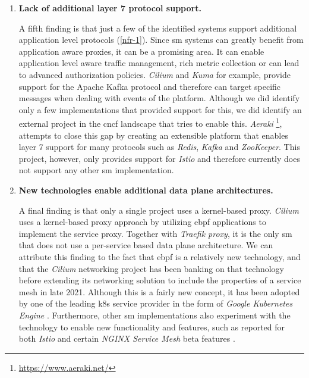 \begin{enumerate}[label=\textbf{F\arabic*}, leftmargin=3\parindent]
    \item \textbf{Lack of additional layer 7 protocol support.}
    \label{f-5}
    
    A fifth finding is that just a few of the identified systems support additional application level protocols (\ref{nfr-1}).  Since \gls{sm} systems can greatly benefit from application aware proxies, it can be a promising area. It can enable application level aware traffic management, rich metric collection or can lead to advanced authorization policies. \textit{Cilium} and \textit{Kuma} for example, provide support for the Apache Kafka protocol and therefore can target specific messages when dealing with events of the platform.  Although we did identify only a few implementations that provided support for this, we did identify an external project in the \gls{cncf} landscape that tries to enable this. \textit{Aeraki} \footnote{\url{https://www.aeraki.net/}}, attempts to close this gap by creating an extensible platform that enables layer 7 support for many protocols such as \textit{Redis}, \textit{Kafka} and \textit{ZooKeeper}. This project, however, only provides support for \textit{Istio} and therefore currently does not support any other \gls{sm} implementation.
    
    \item \textbf{New technologies enable additional data plane architectures.}
    \label{f-6}
    
    A final finding is that only a single project uses a kernel-based proxy. \textit{Cilium} uses a kernel-based proxy approach by utilizing \gls{ebpf} applications to implement the service proxy. Together with \textit{Traefik proxy}, it is the only \gls{sm} that does not use a per-service based data plane architecture. We can attribute this finding to the fact that \gls{ebpf} is a relatively new technology, and that the \textit{Cilium} networking project has been banking on that technology before extending its networking solution to include the properties of a service mesh \cite{cilium-mesh} in late 2021. Although this is a fairly new concept, it has been adopted by one of the leading \gls{k8s} service provider in the form of \textit{Google Kubernetes Engine} \cite{google-cilium-ebpf}. Furthermore, other \gls{sm} implementations also experiment with the technology to enable new functionality and features, such as reported for both \textit{Istio} \cite{istio-merbridge} and certain \textit{NGINX Service Mesh} beta features \cite{nginx-service-mesh-arch}. 
\end{enumerate}


